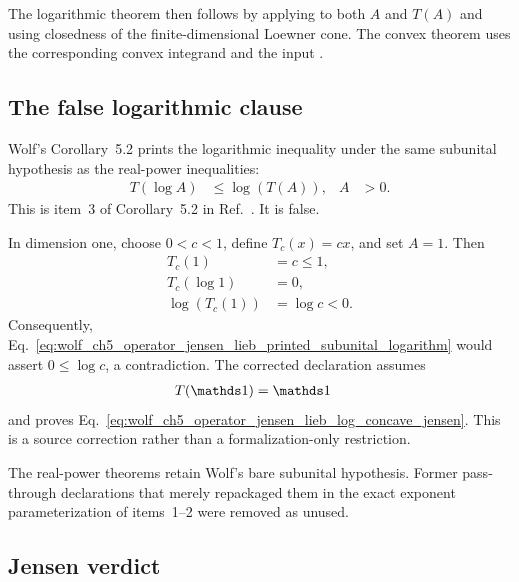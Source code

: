 \documentclass{article}
\begin{document}
The logarithmic theorem
 then follows by applying
 to both $A$ and $T(A)$ and using
closedness of the finite-dimensional Loewner cone. The convex theorem
 uses the corresponding convex integrand and
the input .

\subsection{The false logarithmic clause}

Wolf's Corollary~5.2 prints the logarithmic inequality under the same
subunital hypothesis as the real-power inequalities:
\begin{align}
    T(\log A)&\leq\log(T(A)),
    &
    A&>0.
    \label{eq:wolf_ch5_operator_jensen_lieb_printed_subunital_logarithm}
\end{align}
This is item~3 of Corollary~5.2 in Ref.~\cite{Wolf2012Quantum}. It is false.

In dimension one, choose $0<c<1$, define $T_c(x)=cx$, and set $A=1$. Then
\begin{align}
    T_c(1)&=c\leq 1,
    \label{eq:wolf_ch5_operator_jensen_lieb_scalar_map_subunital}\\
    T_c(\log 1)&=0,
    \label{eq:wolf_ch5_operator_jensen_lieb_scalar_logarithm_left}\\
    \log(T_c(1))&=\log c<0.
    \label{eq:wolf_ch5_operator_jensen_lieb_scalar_logarithm_right}
\end{align}
Consequently,
Eq.~\ref{eq:wolf_ch5_operator_jensen_lieb_printed_subunital_logarithm} would
assert $0\leq\log c$, a contradiction. The corrected declaration
 assumes
\begin{align}
    T(\Id)&=\Id
    \label{eq:wolf_ch5_operator_jensen_lieb_corrected_logarithm_unitality}
\end{align}
and proves
Eq.~\ref{eq:wolf_ch5_operator_jensen_lieb_log_concave_jensen}. This is a
source correction rather than a formalization-only restriction.

The real-power theorems retain Wolf's bare subunital hypothesis. Former
pass-through declarations that merely repackaged them in the exact exponent
parameterization of items~1--2 were removed as unused.

\subsection{Jensen verdict}
\end{document}
